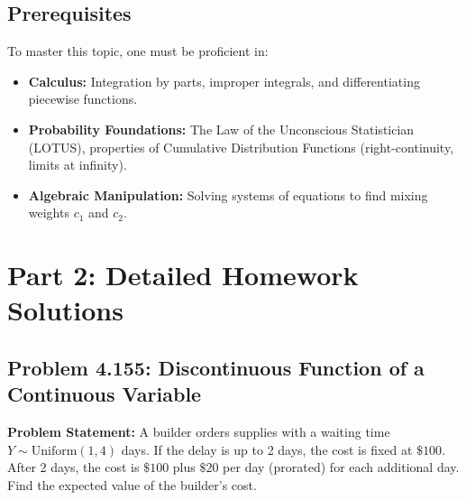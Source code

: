 \documentclass[11pt, a4paper]{article}
\theoremstyle{definition}
\theoremstyle{remark}
\begin{document}
\subsection{Prerequisites}
To master this topic, one must be proficient in:
\begin{itemize}
    \item \textbf{Calculus:} Integration by parts, improper integrals, and differentiating piecewise functions.
    \item \textbf{Probability Foundations:} The Law of the Unconscious Statistician (LOTUS), properties of Cumulative Distribution Functions (right-continuity, limits at infinity).
    \item \textbf{Algebraic Manipulation:} Solving systems of equations to find mixing weights $c_1$ and $c_2$.
\end{itemize}

\newpage
\section{Part 2: Detailed Homework Solutions}

\subsection{Problem 4.155: Discontinuous Function of a Continuous Variable}
\textbf{Problem Statement:} A builder orders supplies with a waiting time $Y \sim \text{Uniform}(1, 4)$ days. If the delay is up to 2 days, the cost is fixed at $\$100$. After 2 days, the cost is $\$100$ plus $\$20$ per day (prorated) for each additional day. Find the expected value of the builder's cost.
\end{document}
